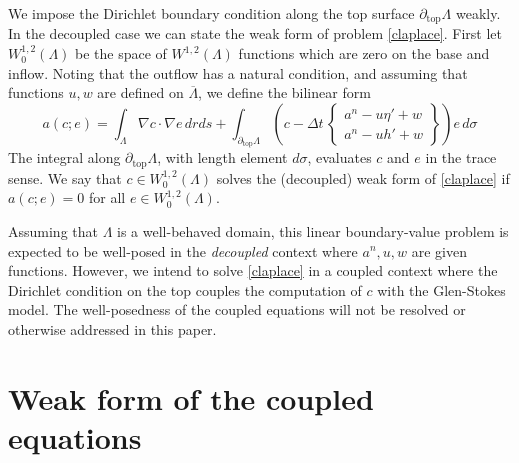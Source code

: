 \documentclass[letterpaper,final,12pt,reqno]{amsart}
\newcommand{\grad}{\nabla}
\begin{document}
We impose the Dirichlet boundary condition along the top surface $\partial_{\text{top}} \Lambda$ weakly.  In the decoupled case we can state the weak form of problem \eqref{claplace}.  First let $W_0^{1,2}(\Lambda)$ be the space of $W^{1,2}(\Lambda)$ functions which are zero on the base and inflow.  Noting that the outflow has a natural condition, and assuming that functions $u,w$ are defined on $\overline\Lambda$, we define the bilinear form
\begin{equation}
a(c;e) = \int_\Lambda \grad c \cdot \grad e \,dr ds + \int_{\partial_{\text{top}} \Lambda} \left(c - \Delta t\,\begin{Bmatrix} a^n - u \eta' + w \\ a^n - u h' + w \end{Bmatrix}\right) e\,d\sigma \label{surfaceweakform}
\end{equation}
The integral along $\partial_{\text{top}} \Lambda$, with length element $d\sigma$, evaluates $c$ and $e$ in the trace sense.  We say that $c \in W_0^{1,2}(\Lambda)$ solves the (decoupled) weak form of \eqref{claplace} if $a(c;e)=0$ for all $e \in W_0^{1,2}(\Lambda)$.

Assuming that $\Lambda$ is a well-behaved domain, this linear boundary-value problem is expected to be well-posed in the \emph{decoupled} context where $a^n,u,w$ are given functions.  However, we intend to solve \eqref{claplace} in a coupled context where the Dirichlet condition on the top couples the computation of $c$ with the Glen-Stokes model.  The well-posedness of the coupled equations will not be resolved or otherwise addressed in this paper.



\section{Weak form of the coupled equations} \label{sec:weakformcoupled}
\end{document}

